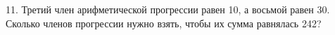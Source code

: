 11. Третий член арифметической прогрессии равен 10, а восьмой равен 30. Сколько членов прогрессии нужно взять, чтобы их сумма равнялась 242?\\
